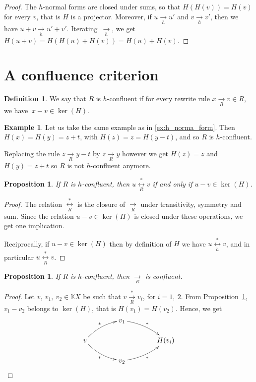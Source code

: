\documentclass[10pt]{easychair}
\newtheorem{proposition}[theorem]{Proposition}
\theoremstyle{definition}
\newtheorem{definition}[theorem]{Definition}
\newtheorem{example}[theorem]{Example}
\newcommand\K{\mathbb{K}}
\newcommand\KX{\K X}
\newcommand\rewR{\underset{R}{\longrightarrow}}
\newcommand\rewh{\underset{h}{\longrightarrow}}
\newcommand\transR{\overset{*}{\rewR}}
\newcommand\equivR{\underset{R}{\overset{*}{\longleftrightarrow}}}
\newcommand\equivh{\underset{h}{\overset{*}{\longleftrightarrow}}}
\begin{document}
\begin{proof}
  The $h$-normal forms are closed under sums, so that $H(H(v))=H(v)$ for
  every $v$, that is $H$ is a projector. Moreover, if $u \rewh u'$ and
  $v \rewh v'$, then we have $u + v \rewh u' + v'$. Iterating~$\rewh$, we
  get $H(u + v) = H (H(u)+H(v))=H(u)+H(v)$. 
\end{proof}

\section{A confluence criterion}




\begin{definition}\label{def:standardisation_property}
  We say that $R$ is $h$-confluent if for every rewrite rule $x\rewR v\in R$, we have $\ x-v\in\ker(H)$.
\end{definition}

\begin{example}
Let us take the same example as in \ref{ex:h_norma_form}. Then $H(x) = H(y) = z + t$, with $H(z) = z = H(y - t)$, and so $R$ is $h$-confluent.

Replacing the rule $z \rewR y - t$ by $z \rewR y$ however we get $H(z) = z$ and $H(y) = z + t$ so $R$ is not $h$-confluent anymore. 
\end{example}

\begin{proposition}\label{prop:equationnal_theory}
  If $R$ is $h$-confluent, then
  $u \equivR v$ if and only if $u-v\in\ker(H)$.
\end{proposition}

\begin{proof}
The relation $\equivR$ is the closure of $\rewR$ under transitivity, symmetry and sum. Since the relation $u - v \in \ker(H)$ is closed under these operations, we get one implication.

Reciprocally, if $u - v \in \ker(H)$ then by definition of $H$ we have $u \equivh v$, and in particular $u \equivR v$.
\end{proof}

\begin{proposition}
If $R$ is $h$-confluent, then $\rewR$ is confluent.
\end{proposition}
\begin{proof}
  Let $v,\ v_1,\ v_2\in\KX$ be such that $v\transR v_i$, for $i=1,\ 2$.
  From Proposition~\ref{prop:equationnal_theory}, $v_1-v_2$ belongs to
  $\ker(H)$, that is $H(v_1)=H(v_2)$. Hence, we get
  \[
    \xymatrix @C = 4em @R = 1.5em{
      &
      v_1
      \ar@/^/ [rd] ^{*}
      & \\
      v
      \ar@/^/ [ru] ^{*}
      \ar@/_/ [rd] _{*}
      &
      &
      H(v_i)
      \\
      &
      v_2
      \ar@/_/  [ru] _{*}
      &
    }
  \]
  
\end{proof}
\end{document}
